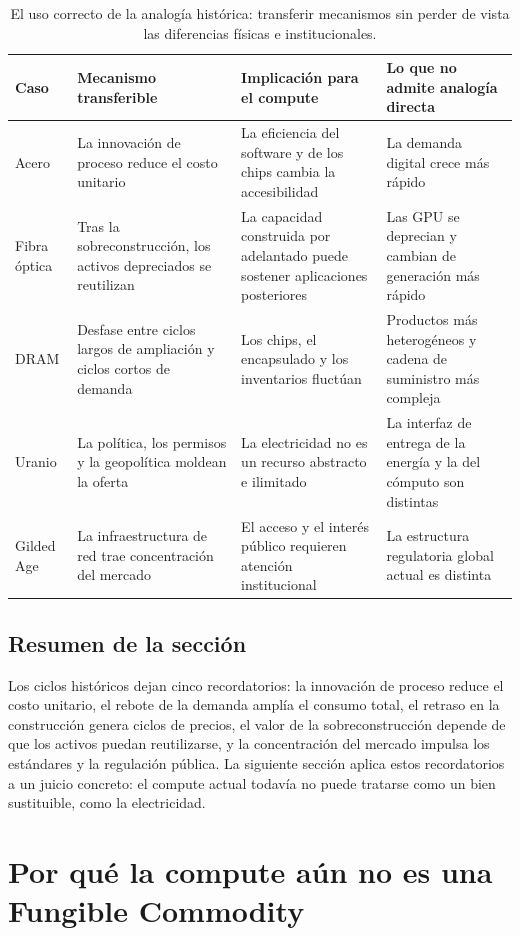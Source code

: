 \documentclass[a4paper]{article}
\begin{document}
\begin{table}[H]
\centering
\begin{tabular}{L{0.14\textwidth}L{0.21\textwidth}L{0.23\textwidth}L{0.25\textwidth}}
\toprule
Caso & Mecanismo transferible & Implicación para el compute & Lo que no admite analogía directa \\
\midrule
Acero & La innovación de proceso reduce el costo unitario & La eficiencia del software y de los chips cambia la accesibilidad & La demanda digital crece más rápido \\
Fibra óptica & Tras la sobreconstrucción, los activos depreciados se reutilizan & La capacidad construida por adelantado puede sostener aplicaciones posteriores & Las GPU se deprecian y cambian de generación más rápido \\
DRAM & Desfase entre ciclos largos de ampliación y ciclos cortos de demanda & Los chips, el encapsulado y los inventarios fluctúan & Productos más heterogéneos y cadena de suministro más compleja \\
Uranio & La política, los permisos y la geopolítica moldean la oferta & La electricidad no es un recurso abstracto e ilimitado & La interfaz de entrega de la energía y la del cómputo son distintas \\
Gilded Age & La infraestructura de red trae concentración del mercado & El acceso y el interés público requieren atención institucional & La estructura regulatoria global actual es distinta \\
\bottomrule
\end{tabular}
\caption{El uso correcto de la analogía histórica: transferir mecanismos sin perder de vista las diferencias físicas e institucionales.}
\end{table}

\subsection{Resumen de la sección}

Los ciclos históricos dejan cinco recordatorios: la innovación de proceso reduce el costo unitario, el rebote de la demanda amplía el consumo total, el retraso en la construcción genera ciclos de precios, el valor de la sobreconstrucción depende de que los activos puedan reutilizarse, y la concentración del mercado impulsa los estándares y la regulación pública. La siguiente sección aplica estos recordatorios a un juicio concreto: el compute actual todavía no puede tratarse como un bien sustituible, como la electricidad.
\section{Por qué la compute aún no es una Fungible Commodity}
\end{document}
